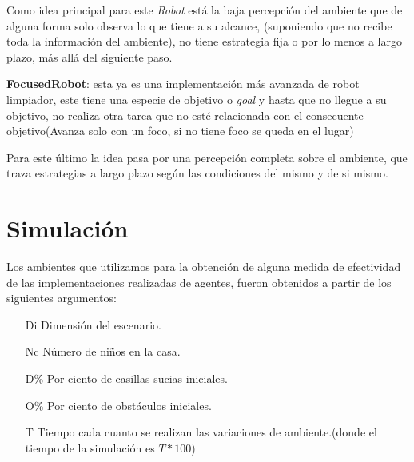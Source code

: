 \documentclass[a4paper,10pt,twocolumn]{article}
\begin{document}
 Como idea principal para este \textit{Robot} est\'a la baja percepci\'on del ambiente que de alguna forma solo observa lo que tiene a su alcance, (suponiendo que no recibe toda la informaci\'on del ambiente), no tiene estrategia fija o por lo menos a largo plazo, m\'as all\'a del siguiente paso.

 \textbf{FocusedRobot}: esta ya es una implementaci\'on m\'as avanzada de robot limpiador, este tiene una especie de objetivo o \textit{goal} y hasta que no llegue a su objetivo, no realiza otra tarea que no est\'e relacionada con el consecuente objetivo(Avanza solo con un foco, si no tiene foco se queda en el lugar)
 
 Para este \'ultimo la idea pasa por una percepci\'on completa sobre el ambiente, que traza estrategias a largo plazo seg\'un las condiciones del mismo y de si mismo.
\section{Simulación}
Los ambientes que utilizamos para la obtenci\'on de alguna medida de efectividad de las implementaciones realizadas de agentes, fueron obtenidos a partir de los siguientes argumentos:
\begin{itemize}
	\item[Di]  Dimensi\'on del escenario.
	\item[Nc]  N\'umero de ni\~nos en la casa.
	\item[D\%] Por ciento de casillas sucias iniciales.
	\item[O\%] Por ciento de obst\'aculos iniciales.
	\item[T]  Tiempo cada cuanto se realizan las variaciones de ambiente.(donde el tiempo de la simulaci\'on es $T*100$)  
\end{itemize}
\end{document}
